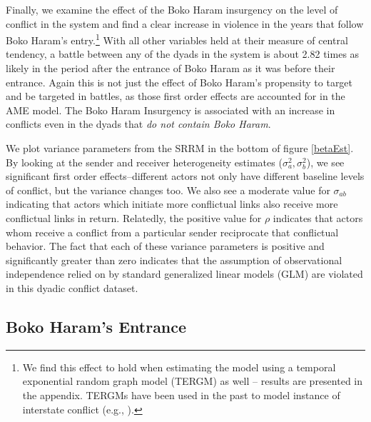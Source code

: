 Finally, we examine the effect of the Boko Haram insurgency on the level of conflict in the system and find a clear increase in violence in the years that follow Boko Haram's entry.\footnote{We find this effect to hold when estimating the model using a temporal exponential random graph model (TERGM) as well -- results are presented in the appendix. TERGMs have been used in the past to model instance of interstate conflict (e.g., \citealp{cranmer:desmarais:2011}).} With all other variables held at their measure of central tendency, a battle between any of the dyads in the system is about 2.82 times as likely in the period after the entrance of Boko Haram as it was before their entrance. Again this is not just the effect of Boko Haram's propensity to target and be targeted in battles, as those first order effects are accounted for in the AME model. The Boko Haram Insurgency is associated with an increase in conflicts even in the dyads that \emph{do not contain Boko Haram}.

We plot variance parameters from the SRRM in the bottom of figure \ref{betaEst}. By looking at the sender and receiver heterogeneity estimates ($\sigma^{2}_{a}, \sigma^{2}_{b}$), we see significant first order effects--different actors not only have different baseline levels of conflict, but the variance changes too. We also see a moderate value for $\sigma_{ab}$ indicating that actors which initiate more conflictual links also receive more conflictual links in return. Relatedly, the positive value for $\rho$ indicates that actors whom receive a conflict from a particular sender reciprocate that conflictual behavior. The fact that each of these variance parameters is positive and significantly greater than zero indicates that the assumption of observational independence relied on by standard generalized linear models (GLM) are violated in this dyadic conflict dataset.

\subsection*{Boko Haram's Entrance}

